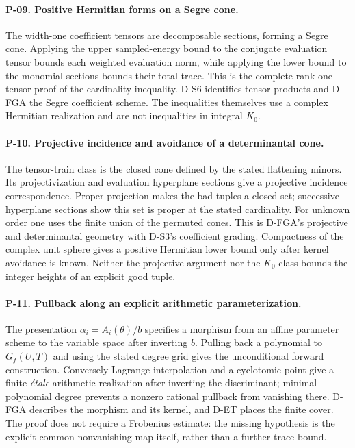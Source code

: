 \documentclass[11pt,a4paper]{article}
\theoremstyle{definition}\newtheorem{definition}{Definition}
\begin{document}
\paragraph{P-09. Positive Hermitian forms on a Segre cone.}
The width-one coefficient tensors are decomposable sections, forming a Segre cone. Applying the upper sampled-energy bound to the conjugate evaluation tensor bounds each weighted evaluation norm, while applying the lower bound to the monomial sections bounds their total trace. This is the complete rank-one tensor proof of the cardinality inequality. D-S6 identifies tensor products and D-FGA the Segre coefficient scheme. The inequalities themselves use a complex Hermitian realization and are not inequalities in integral $K_0$.

\paragraph{P-10. Projective incidence and avoidance of a determinantal cone.}
The tensor-train class is the closed cone defined by the stated flattening minors. Its projectivization and evaluation hyperplane sections give a projective incidence correspondence. Proper projection makes the bad tuples a closed set; successive hyperplane sections show this set is proper at the stated cardinality. For unknown order one uses the finite union of the permuted cones. This is D-FGA's projective and determinantal geometry with D-S3's coefficient grading. Compactness of the complex unit sphere gives a positive Hermitian lower bound only after kernel avoidance is known. Neither the projective argument nor the $K_0$ class bounds the integer heights of an explicit good tuple.

\paragraph{P-11. Pullback along an explicit arithmetic parameterization.}
The presentation $\alpha_i=A_i(\theta)/b$ specifies a morphism from an affine parameter scheme to the variable space after inverting $b$. Pulling back a polynomial to $G_f(U,T)$ and using the stated degree grid gives the unconditional forward construction. Conversely Lagrange interpolation and a cyclotomic point give a finite \emph{\'etale} arithmetic realization after inverting the discriminant; minimal-polynomial degree prevents a nonzero rational pullback from vanishing there. D-FGA describes the morphism and its kernel, and D-ET places the finite cover. The proof does not require a Frobenius estimate: the missing hypothesis is the explicit common nonvanishing map itself, rather than a further trace bound.
\end{document}
